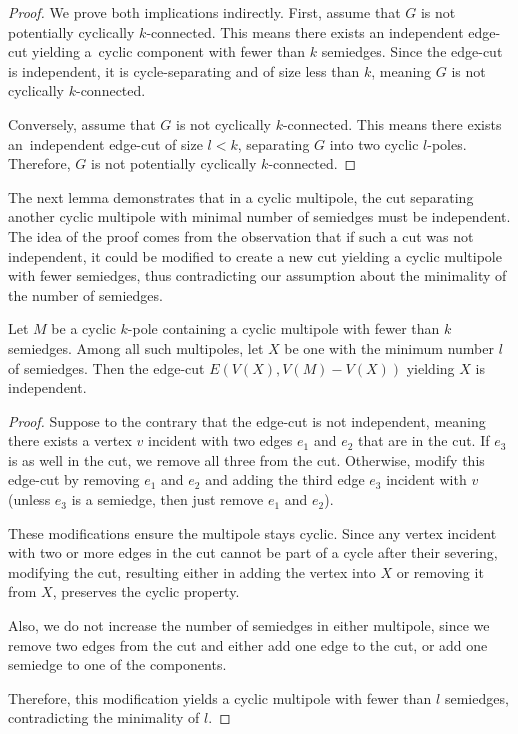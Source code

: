\documentclass[12pt, twoside]{book}
\begin{document}
\begin{proof}
	We prove both implications indirectly. First, assume that $G$ is not potentially cyclically $k$-connected. This means there exists an independent edge-cut yielding a~cyclic component with fewer than $k$ semiedges. Since the edge-cut is independent, it is \mbox{cycle-separating} and of size less than $k$, meaning $G$ is not cyclically $k$-connected.
	
	Conversely, assume that $G$ is not cyclically \mbox{$k$-connected}. This means there exists an~independent edge-cut of size $l<k$, separating $G$ into two cyclic $l$-poles. Therefore, $G$ is not potentially cyclically $k$-connected.
\end{proof}

The next lemma demonstrates that in a cyclic multipole, the cut separating another cyclic multipole with minimal number of semiedges must be independent. The idea of the proof comes from the observation that if such a cut was not independent, it could be modified to create a new cut yielding a cyclic multipole with fewer semiedges, thus contradicting our assumption about the minimality of the number of semiedges.

\begin{lemma}\label{lem:smallest-cut-in-mpoles-is-independent}
	Let $M$ be a cyclic $k$-pole containing a cyclic multipole with fewer than $k$ semiedges. Among all such multipoles, let $X$ be one with the minimum number $l$ of semiedges. Then the edge-cut $E\left(V(X), V(M)-V(X)\right)$ yielding $X$ is independent.
\end{lemma}

\begin{proof}
	Suppose to the contrary that the edge-cut is not independent, meaning there exists a vertex $v$ incident with two edges $e_1$ and $e_2$ that are in the cut. If $e_3$ is as well in the cut, we remove all three from the cut. Otherwise, modify this edge-cut by removing $e_1$ and $e_2$ and adding the third edge $e_3$ incident with $v$ (unless $e_3$ is a semiedge, then just remove $e_1$ and $e_2$).
	
	These modifications ensure the multipole stays cyclic. Since any vertex incident with two or more edges in the cut cannot be part of a cycle after their severing, modifying the cut, resulting either in adding the vertex into $X$ or removing it from $X$, preserves the cyclic property.
	
	Also, we do not increase the number of semiedges in either multipole, since we remove two edges from the cut and either add one edge to the cut, or add one semiedge to one of the components.
	
	Therefore, this modification yields a cyclic multipole with fewer than $l$ semiedges, contradicting the minimality of $l$.
\end{proof}
\end{document}

